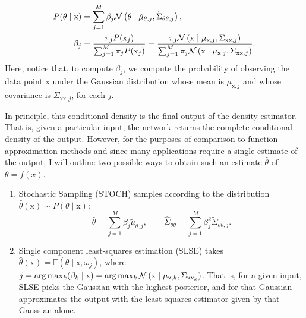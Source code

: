 %
\begin{align}
    \begin{split}
    P(\theta \mid \mathrm{x}) &= \sum_{j=1}^M \beta_j \mathcal{N}\left(\theta \mid \tilde{\mu}_{\theta,j}, \tilde{\Sigma}_{\theta\theta,j} \right), \\
    \beta_j &= \frac{\pi_j P(\mathrm{x}_j)}{\sum_{j=1}^M \pi_j P(\mathrm{x}_j)} = 
    \frac{\pi_j \mathcal{N}\left(\mathrm{x} \mid {\mu}_{\mathrm{x},j}, {\Sigma}_{\mathrm{xx},j} \right)}
    {\sum_{j=1}^M \pi_j \mathcal{N}\left(\mathrm{x} \mid {\mu}_{\mathrm{x},j}, {\Sigma}_{\mathrm{xx},j} \right)}.
    \end{split}
    \label{eq:posterior_distribution}
\end{align}
%
Here, notice that, to compute $\beta_j$, we compute the probability of observing
the data point $\mathrm{x}$ under the Gaussian distribution whose mean is
$\mu_{\mathrm{x},j}$ and whose covariance is $\Sigma_{\mathrm{xx},j}$, for each
$j$.


In principle, this conditional density is the final output of the density
estimator. That is, given a particular input, the network returns the complete
conditional density of the output. However, for the purposes of comparison to
function approximation methods and since many applications require a single
estimate of the output, I will outline two possible ways to obtain such an
estimate $\hat{\theta}$ of $\theta = f(x)$.

\begin{enumerate}
    \item Stochastic Sampling (STOCH) samples according to the distribution
    $\hat{\theta}(\mathrm{x}) \sim P(\theta \mid \mathrm{x})$:
    \begin{equation*}
        \hat{\theta} = \sum_{j=1}^M \beta_j \tilde{\mu}_{\theta,j}, \qquad
        \hat{\Sigma}_{\theta\theta} = \sum_{j=1}^M \beta_j^2 \tilde{\Sigma}_{\theta\theta,j}.
    \end{equation*}
    \item Single component least-squares estimation (SLSE) takes
    $\hat{\theta}(\mathrm{x}) = \mathbb{E}\left( \theta \mid \mathrm{x},
    \omega_j \right)$, where $j = \arg \max_k (\beta_k \mid \mathrm{x}) = \arg
    \max_k \mathcal{N}\left(\mathrm{x} \mid \mu_{\mathrm{x},k},
    \Sigma_{\mathrm{xx}_k}\right)$. That is, for a given input, SLSE picks the
    Gaussian with the highest posterior, and for that Gaussian approximates the
    output with the least-squares estimator given by that Gaussian alone.
\end{enumerate}


